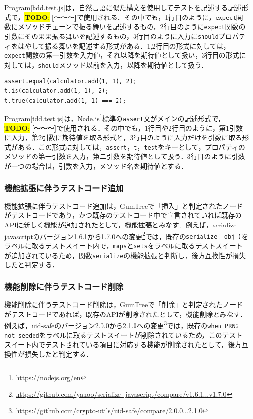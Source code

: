 \documentclass[11pt,dvipdfmx]{jreport}
\newcommand{\todo}[1]{\colorbox{yellow}{{\bf TODO}:}{\color{red} {\textbf{[#1]}}}}
\begin{document}
Program\ref{bdd.test.js}は，自然言語に似た構文を使用してテストを記述する記述形式で，\todo{〜〜〜}で使用される．その中でも，1行目のように，{\verb|expect|}関数にメソッドチェーンで振る舞いを記述するもの，2行目のように{\verb|expect|}関数の引数にそのまま振る舞いを記述するもの，3行目のように入力に{\verb|should|}プロパティをはやして振る舞いを記述する形式がある．1,2行目の形式に対しては，{\verb|expect|}関数の第一引数を入力値，それ以降を期待値として扱い，3行目の形式に対しては，{\verb|should|}メソッド以前を入力，以降を期待値として扱う．

\begin{lstlisting}[caption=アサーション例2, label=tdd.test.js]
assert.equal(calculator.add(1, 1), 2);
t.is(calculator.add(1, 1), 2);  
t.true(calculator.add(1, 1) === 2);
\end{lstlisting}

Program\ref{tdd.test.js}は，Node.js\footnote{\url{https://nodejs.org/en}}標準の{\verb|assert|}文がメインの記述形式で，\todo{〜〜〜}で使用される．その中でも，1行目や2行目のように，第1引数に入力，第2引数に期待値を取る形式と，3行目のように入力だけを引数に取る形式がある．この形式に対しては，{\verb|assert|}，{\verb|t|}，{\verb|test|}をキーとして，プロパティのメソッドの第一引数を入力，第二引数を期待値として扱う．3行目のように引数が一つの場合は，引数を入力，メソッド名を期待値とする．

\subsubsection{機能拡張に伴うテストコード追加}
機能拡張に伴うテストコード追加は，GumTreeで「挿入」と判定されたノードがテストコードであり，かつ既存のテストコード中で宣言されていれば既存のAPIに新しく機能が追加されたとして，機能拡張とみなす．例えば，serialize-javascriptのバージョン1.6.1から1.7.0への変更\footnote{\url{https://github.com/yahoo/serialize- javascript/compare/v1.6.1...v1.7.0}}では，既存の{\verb|serialize( obj )|}をラベルに取るテストスイート内で，{\verb|maps|}と{\verb|sets|}をラベルに取るテストスイートが追加されているため，関数{\verb|serialize|}の機能拡張と判断し，後方互換性が損失したと判定する．

\subsubsection{機能削除に伴うテストコード削除}
機能削除に伴うテストコード削除は，GumTreeで「削除」と判定されたノードがテストコードであれば，既存のAPIが削除されたとして，機能削除とみなす．例えば，uid-safeのバージョン2.0.0から2.1.0への変更\footnote{\url{https://github.com/crypto-utils/uid-safe/compare/2.0.0...2.1.0}}では，既存の{\verb|when PRNG not seeded|}をラベルに取るテストスイートが削除されているため，このテストスイート内でテストされている項目に対応する機能が削除されたとして，後方互換性が損失したと判定する．
\end{document}
